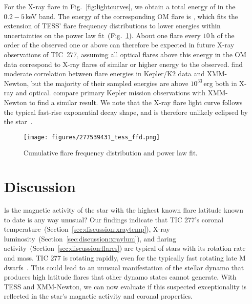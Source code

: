 \documentclass[twocolumn]{aastex631}
\begin{document}
For the X-ray flare in Fig.~\ref{fig:lightcurves}, we obtain a total energy of \eepic in the $0.2-5\,$keV band. The energy of the corresponding OM flare is \eom, which fits the extension of TESS' flare frequency distributions to lower energies within uncertainties on the power law fit~(Fig.~\ref{fig:ffd}). About one flare every $10\,$h of the order of the observed one or above can therefore be expected in future X-ray observations of TIC~277, assuming all optical flares above this energy in the OM data correspond to X-ray flares of similar or higher energy to the observed. \citet{guarcello2019simultaneous} find moderate correlation between flare energies in Kepler/K2 data and XMM-Newton, but the majority of their sampled energies are above $10^{33}\,$erg both in X-ray and optical. \citet{kuznetsov2021stellar} compare primary Kepler mission observations with XMM-Newton to find a similar result. We note that the X-ray flare light curve follows the typical fast-rise exponential decay shape, and is therefore unlikely eclipsed by the star~\citep{johnstone2012soft}.


\begin{figure}
    \begin{centering}
        \texttt{[image: figures/277539431\_tess\_ffd.png]}
        \caption{
         Cumulative flare frequency distribution and power law fit.
        }
        \label{fig:ffd}
    \end{centering}
\end{figure}

\section{Discussion}
\label{sec:discussion}

Is the magnetic activity of the star with the highest known flare latitude known to date is any way unusual? Our findings indicate that TIC 277's coronal temperature~(Section~\ref{sec:discussion:xraytemp}), X-ray luminosity~(Section~\ref{sec:discussion:xraylum}), and flaring activity~(Section~\ref{sec:discussion:flares}) are typical of stars with its rotation rate and mass. TIC 277 is rotating rapidly, even for the typically fast rotating late M dwarfs~\citep{medina2022galactic}. This could lead to an unusual manifestation of the stellar dynamo that produces high latitude flares that other dynamo states cannot generate. With TESS and XMM-Newton, we can now evaluate if this suspected exceptionality is reflected in the star's magnetic activity and coronal properties. 
\end{document}
